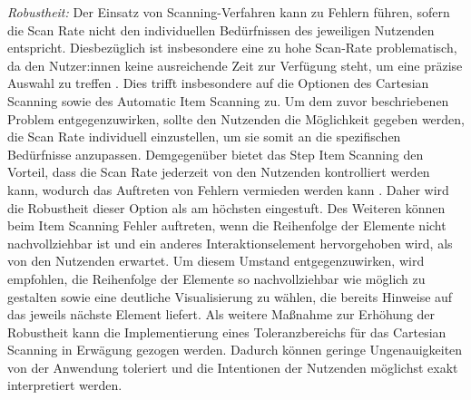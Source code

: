 \textit{Robustheit:}
Der Einsatz von Scanning-Verfahren kann zu Fehlern führen, sofern die Scan Rate nicht den individuellen Bedürfnissen des jeweiligen Nutzenden entspricht. Diesbezüglich ist insbesondere eine zu hohe Scan-Rate problematisch, da den Nutzer:innen keine ausreichende Zeit zur Verfügung steht, um eine präzise Auswahl zu treffen \citep{COOK2015117}. Dies trifft insbesondere auf die Optionen des Cartesian Scanning sowie des Automatic Item Scanning zu. Um dem zuvor beschriebenen Problem entgegenzuwirken, sollte den Nutzenden die Möglichkeit gegeben werden, die Scan Rate individuell einzustellen, um sie somit an die spezifischen Bedürfnisse anzupassen. 
Demgegenüber bietet das Step Item Scanning den Vorteil, dass die Scan Rate jederzeit von den Nutzenden kontrolliert werden kann, wodurch das Auftreten von Fehlern vermieden werden kann \citep{COOK2015117}. Daher wird die Robustheit dieser Option als am höchsten eingestuft. 
Des Weiteren können beim Item Scanning Fehler auftreten, wenn die Reihenfolge der Elemente nicht nachvollziehbar ist und ein anderes Interaktionselement hervorgehoben wird, als von den Nutzenden erwartet. Um diesem Umstand entgegenzuwirken, wird empfohlen, die Reihenfolge der Elemente so nachvollziehbar wie möglich zu gestalten sowie eine deutliche Visualisierung zu wählen, die bereits Hinweise auf das jeweils nächste Element liefert.
Als weitere Maßnahme zur Erhöhung der Robustheit kann die Implementierung eines Toleranzbereichs für das Cartesian Scanning in Erwägung gezogen werden. Dadurch können geringe Ungenauigkeiten von der Anwendung toleriert und die Intentionen der Nutzenden möglichst exakt interpretiert werden.

